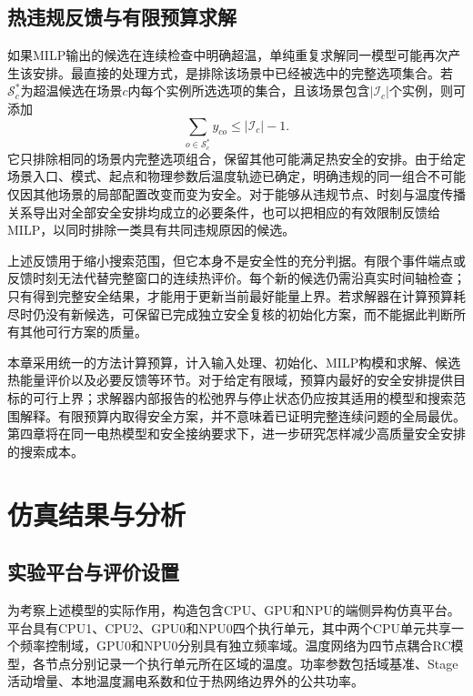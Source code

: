 \subsection{热违规反馈与有限预算求解}

如果MILP输出的候选在连续检查中明确超温，单纯重复求解同一模型可能再次产生该安排。最直接的处理方式，是排除该场景中已经被选中的完整选项集合。若$\mathcal S_c^*$为超温候选在场景$c$内每个实例所选选项的集合，且该场景包含$|\mathcal I_c|$个实例，则可添加
\begin{equation}
 \sum_{o\in\mathcal S_c^*}y_{co}
       \le |\mathcal I_c|-1.
 \label{eq:c3-no-good}
\end{equation}
它只排除相同的场景内完整选项组合，保留其他可能满足热安全的安排。由于给定场景入口、模式、起点和物理参数后温度轨迹已确定，明确违规的同一组合不可能仅因其他场景的局部配置改变而变为安全。对于能够从违规节点、时刻与温度传播关系导出对全部安全安排均成立的必要条件，也可以把相应的有效限制反馈给MILP，以同时排除一类具有共同违规原因的候选。

上述反馈用于缩小搜索范围，但它本身不是安全性的充分判据。有限个事件端点或反馈时刻无法代替完整窗口的连续热评价。每个新的候选仍需沿真实时间轴检查；只有得到完整安全结果，才能用于更新当前最好能量上界。若求解器在计算预算耗尽时仍没有新候选，可保留已完成独立安全复核的初始化方案，而不能据此判断所有其他可行方案的质量。

本章采用统一的方法计算预算，计入输入处理、初始化、MILP构模和求解、候选热能量评价以及必要反馈等环节。对于给定有限域，预算内最好的安全安排提供目标的可行上界；求解器内部报告的松弛界与停止状态仍应按其适用的模型和搜索范围解释。有限预算内取得安全方案，并不意味着已证明完整连续问题的全局最优。第四章将在同一电热模型和安全接纳要求下，进一步研究怎样减少高质量安全安排的搜索成本。


\section{仿真结果与分析}

\subsection{实验平台与评价设置}

为考察上述模型的实际作用，构造包含CPU、GPU和NPU的端侧异构仿真平台。平台具有CPU1、CPU2、GPU0和NPU0四个执行单元，其中两个CPU单元共享一个频率控制域，GPU0和NPU0分别具有独立频率域。温度网络为四节点耦合RC模型，各节点分别记录一个执行单元所在区域的温度。功率参数包括域基准、Stage活动增量、本地温度漏电系数和位于热网络边界外的公共功率。

